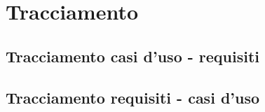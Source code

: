 \section{Tracciamento}

\subsection{Tracciamento casi d'uso - requisiti}
\subsection{Tracciamento requisiti - casi d'uso}
